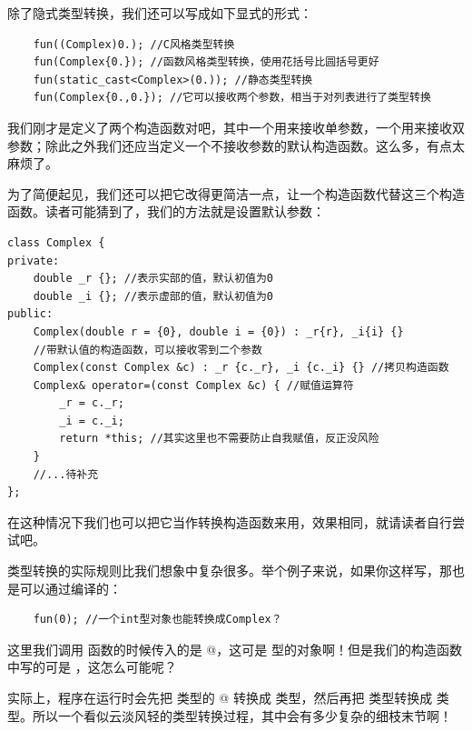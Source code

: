 除了隐式类型转换，我们还可以写成如下显式的形式：
\begin{lstlisting}
    fun((Complex)0.); //C风格类型转换
    fun(Complex{0.}); //函数风格类型转换，使用花括号比圆括号更好
    fun(static_cast<Complex>(0.)); //静态类型转换
    fun(Complex{0.,0.}); //它可以接收两个参数，相当于对列表进行了类型转换
\end{lstlisting}\par
我们刚才是定义了两个构造函数对吧，其中一个用来接收单参数，一个用来接收双参数；除此之外我们还应当定义一个不接收参数的默认构造函数。这么多，有点太麻烦了。\par
为了简便起见，我们还可以把它改得更简洁一点，让一个构造函数代替这三个构造函数。读者可能猜到了，我们的方法就是设置默认参数：
\begin{lstlisting}
class Complex {
private:
    double _r {}; //表示实部的值，默认初值为0
    double _i {}; //表示虚部的值，默认初值为0
public:
    Complex(double r = {0}, double i = {0}) : _r{r}, _i{i} {}
    //带默认值的构造函数，可以接收零到二个参数
    Complex(const Complex &c) : _r {c._r}, _i {c._i} {} //拷贝构造函数
    Complex& operator=(const Complex &c) { //赋值运算符
        _r = c._r;
        _i = c._i;
        return *this; //其实这里也不需要防止自我赋值，反正没风险
    }
    //...待补充
};
\end{lstlisting}
在这种情况下我们也可以把它当作转换构造函数来用，效果相同，就请读者自行尝试吧。\par
类型转换的实际规则比我们想象中复杂很多。举个例子来说，如果你这样写，那也是可以通过编译的：
\begin{lstlisting}
    fun(0); //一个int型对象也能转换成Complex？
\end{lstlisting}
这里我们调用 \lstinline@fun@ 函数的时候传入的是 @，这可是 \lstinline@int@ 型的对象啊！但是我们的构造函数中写的可是 \lstinline@double@，这怎么可能呢？\par
实际上，程序在运行时会先把 \lstinline@int@ 类型的 @ 转换成 \lstinline@double@ 类型，然后再把 \lstinline@double@ 类型转换成 \lstinline@Complex@ 类型。所以一个看似云淡风轻的类型转换过程，其中会有多少复杂的细枝末节啊！\par
